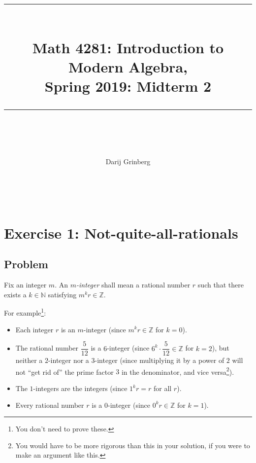 \documentclass[paper=a4, fontsize=12pt]{scrartcl}%
\theoremstyle{plainsl}
\theoremstyle{definition}
\theoremstyle{remark}
\begin{document}
\title{ \\[25pt] \rule{\linewidth}{0.5pt} \\[0.4cm] {\huge Math 4281: Introduction to Modern Algebra, }\\Spring 2019: Midterm 2\\\rule{\linewidth}{2pt} \\[0.5cm] }
\author{Darij Grinberg}
\maketitle

\rule{0pt}{0.3pt} \\[0.4cm]

\section{Exercise 1: Not-quite-all-rationals}

\subsection{Problem}

Fix an integer $m$. An \textit{$m$-integer} shall mean a rational number $r$
such that there exists a $k \in\mathbb{N}$ satisfying $m^{k} r \in\mathbb{Z}$.

For example\footnote{You don't need to prove these.}:

\begin{itemize}
\item Each integer $r$ is an $m$-integer (since $m^{k} r \in\mathbb{Z}$ for $k
= 0$).

\item The rational number $\dfrac{5}{12}$ is a $6$-integer (since $6^{k}
\cdot\dfrac{5}{12} \in\mathbb{Z}$ for $k = 2$), but neither a $2$-integer nor
a $3$-integer (since multiplying it by a power of $2$ will not ``get rid of''
the prime factor $3$ in the denominator, and vice versa\footnote{You would
have to be more rigorous than this in your solution, if you were to make an
argument like this.}).

\item The $1$-integers are the integers (since $1^{k} r = r$ for all $r$).

\item Every rational number $r$ is a $0$-integer (since $0^{k} r \in
\mathbb{Z}$ for $k = 1$).
\end{itemize}
\end{document}
